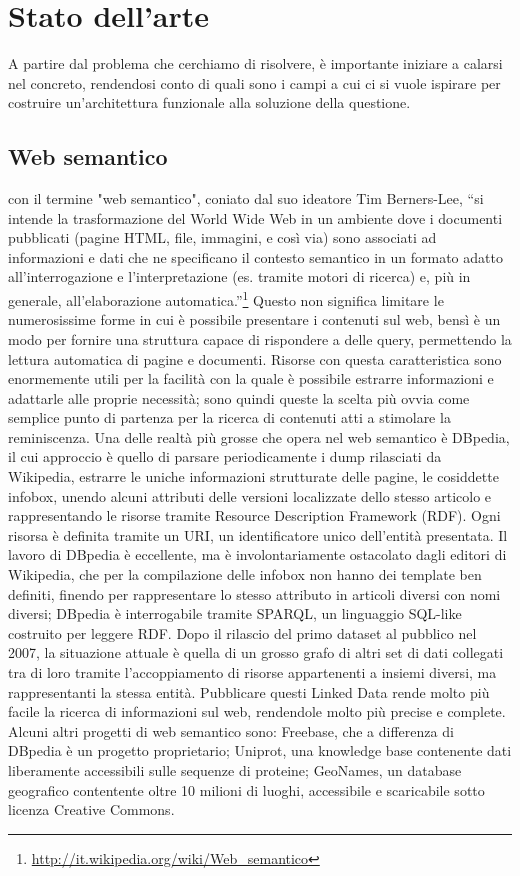 \documentclass[sigproc-sp.tex]{subfiles}
\begin{document}
\section{Stato dell'arte}
A partire dal problema che cerchiamo di risolvere, è importante iniziare a calarsi nel concreto, rendendosi conto di quali sono i campi a cui ci si vuole ispirare per costruire un’architettura funzionale alla soluzione della questione.

\subsection{Web semantico}
con il termine "web semantico", coniato dal suo ideatore Tim Berners-Lee, “si intende la trasformazione del World Wide Web in un ambiente dove i documenti pubblicati (pagine HTML, file, immagini, e così via) sono associati ad informazioni e dati che ne specificano il contesto semantico in un formato adatto all'interrogazione e l'interpretazione (es. tramite motori di ricerca) e, più in generale, all'elaborazione automatica.”\footnote{\url{http://it.wikipedia.org/wiki/Web_semantico}}
Questo non significa limitare le numerosissime forme in cui è possibile presentare i contenuti sul web, bensì è un modo per fornire una struttura capace di rispondere a delle query, permettendo la lettura automatica di pagine e documenti. 
Risorse con questa caratteristica sono enormemente utili per la facilità con la quale è possibile estrarre informazioni e adattarle alle proprie necessità; sono quindi queste la scelta più ovvia come semplice punto di partenza per la ricerca di contenuti atti a stimolare la reminiscenza.
Una delle realtà più grosse che opera nel web semantico è DBpedia, il cui approccio è quello di parsare periodicamente i dump rilasciati da Wikipedia, estrarre le uniche informazioni strutturate delle pagine, le cosiddette infobox, unendo alcuni attributi delle versioni localizzate dello stesso articolo e rappresentando le risorse tramite Resource Description Framework (RDF). Ogni risorsa è definita tramite un URI, un identificatore unico dell’entità presentata. Il lavoro di DBpedia è eccellente, ma è involontariamente ostacolato dagli editori di Wikipedia, che per la compilazione delle infobox non hanno dei template ben definiti, finendo per rappresentare lo stesso attributo in articoli diversi con nomi diversi; DBpedia è interrogabile tramite SPARQL, un linguaggio SQL-like costruito per leggere RDF. Dopo il rilascio del primo dataset al pubblico nel 2007, la situazione attuale è quella di un grosso grafo di altri set di dati collegati tra di loro tramite l’accoppiamento di risorse appartenenti a insiemi diversi, ma rappresentanti la stessa entità. Pubblicare questi Linked Data rende molto più facile la ricerca di informazioni sul web, rendendole molto più precise e complete. Alcuni altri progetti di web semantico sono: Freebase, che a differenza di DBpedia è un progetto proprietario; Uniprot, una knowledge base contenente dati liberamente accessibili sulle sequenze di proteine; GeoNames, un database geografico contentente oltre 10 milioni di luoghi, accessibile e scaricabile sotto licenza Creative Commons.
\end{document}
